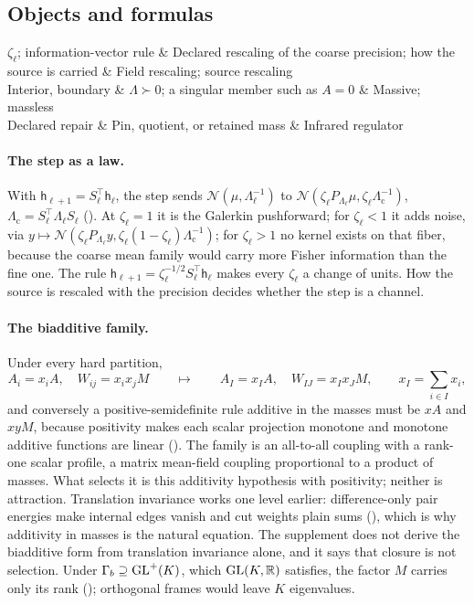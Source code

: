 \subsection{Objects and formulas}

\begin{decoder}
\(\zeta_\ell\); information-vector rule & Declared rescaling of the coarse precision; how the source is carried & Field rescaling; source rescaling\\
Interior, boundary & \(\Lambda\succ0\); a singular member such as \(A=0\) & Massive; massless\\
Declared repair & Pin, quotient, or retained mass & Infrared regulator\\
\end{decoder}

\paragraph{The step as a law.} With \(\mathsf h_{\ell+1}=S_\ell^\top\mathsf h_\ell\), the step sends
\(\mathcal N(\mu,\Lambda_\ell^{-1})\) to \(\mathcal N(\zeta_\ell P_{\Lambda_\ell}\mu,\zeta_\ell\Lambda_{\mathrm c}^{-1})\),
\(\Lambda_{\mathrm c}=S_\ell^\top\Lambda_\ell S_\ell\) (). At \(\zeta_\ell=1\) it is the Galerkin
pushforward; for \(\zeta_\ell<1\) it adds noise, via \(y\mapsto\mathcal N(\zeta_\ell P_{\Lambda_\ell}y,\zeta_\ell(1-\zeta_\ell)
\Lambda_{\mathrm c}^{-1})\); for \(\zeta_\ell>1\) no kernel exists on that fiber, because the coarse mean family would
carry more Fisher information than the fine one. The rule \(\mathsf h_{\ell+1}=\zeta_\ell^{-1/2}S_\ell^\top\mathsf h_\ell\) makes every \(\zeta_\ell\)
a change of units. How the source is rescaled with the precision decides whether the step is a channel.

\paragraph{The biadditive family.} Under every hard partition,
\[
A_i=x_iA,\quad W_{ij}=x_ix_jM
\qquad\longmapsto\qquad
A_I=x_IA,\quad W_{IJ}=x_Ix_JM,\qquad x_I=\sum_{i\in I}x_i,
\]
and conversely a positive-semidefinite rule additive in the masses must be \(xA\) and \(xyM\), because positivity makes
each scalar projection monotone and monotone additive functions are linear ().
The family is an all-to-all coupling with a rank-one scalar profile, a matrix mean-field coupling proportional to a
product of masses. What selects it is this additivity hypothesis with positivity; neither is attraction.
Translation invariance works one level earlier: difference-only pair energies make internal edges vanish and cut
weights plain sums (), which is why additivity in masses is the natural
equation. The supplement does not derive the biadditive form from translation invariance alone, and it says that
closure is not selection. Under \(\Gamma_b\supseteq\mathrm{GL}^+(K)\), which \(\mathrm{GL}(K,\mathbb R)\) satisfies, the factor \(M\) carries only
its rank (); orthogonal frames would leave \(K\) eigenvalues.

